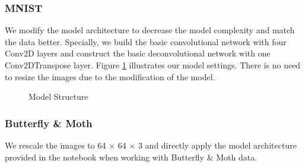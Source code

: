 \documentclass{article}
\begin{document}
\subsubsection{MNIST}
We modify the model architecture to decrease the model complexity and match the data better. Specially, we build the basic convolutional network with four Conv2D layers and construct the basic deconvolutional network with one Conv2DTranspose layer. Figure \ref{fig:3-model} illustrates our model settings. There is no need to resize the images due to the modification of the model.
\begin{figure}[!ht]
    \centering
        \hspace{0.8cm}
    \caption{Model Structure}
    \label{fig:3-model}
\end{figure}

\subsubsection{Butterfly \& Moth}
We rescale the images to 64 $\times$ 64 $\times$ 3 and directly apply the model architecture provided in the notebook when working with Butterfly \& Moth data.
\end{document}
